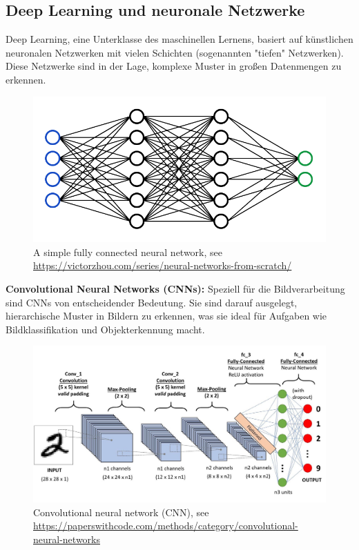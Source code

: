 \documentclass[nolibertine, ngerman]{ttlab-qualify}
\begin{document}
\subsection{Deep Learning und neuronale Netzwerke}

Deep Learning, eine Unterklasse des maschinellen Lernens, basiert auf künstlichen neuronalen Netzwerken mit vielen Schichten (sogenannten "tiefen" Netzwerken). Diese Netzwerke sind in der Lage, komplexe Muster in großen Datenmengen zu erkennen.

\begin{figure}[h]
	\centering
	\includegraphics[scale=0.4]{static/FCnetwork.png}
	\caption{A simple fully connected neural network, see \url{https://victorzhou.com/series/neural-networks-from-scratch/}}
	\label{fig:2.1}
\end{figure}

\textbf{Convolutional Neural Networks (CNNs):} Speziell für die Bildverarbeitung sind CNNs von entscheidender Bedeutung. Sie sind darauf ausgelegt, hierarchische Muster in Bildern zu erkennen, was sie ideal für Aufgaben wie Bildklassifikation und Objekterkennung macht.
\begin{figure}[h]
	\centering
	\includegraphics[scale=0.2]{static/cnn.jpeg}
	\caption{Convolutional neural network (CNN), see \url{https://paperswithcode.com/methods/category/convolutional-neural-networks}}
	\label{fig:2.2}
\end{figure}
\end{document}
